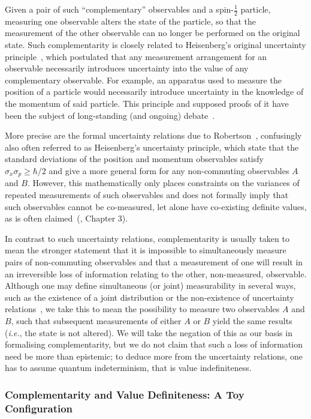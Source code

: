 \documentclass[information,article,accept,moreauthors,pdftex,12pt,a4paper]{mdpi}
\theoremstyle{mdpi}
\newcounter{ex}
\newcounter{re}
\theoremstyle{mdpidefinition}
\begin{document}
Given a pair of such ``complementary'' observables and a spin-$\frac{1}{2}$ particle, measuring one observable alters the state of the particle, so that the measurement of the other observable can no longer be performed on the original state.
Such complementarity is closely related to Heisenberg's original uncertainty principle~\cite{Heisenberg-27}, which postulated that any measurement arrangement for an observable necessarily introduces uncertainty into the value of any complementary observable.
For example, an apparatus used to measure the position of a particle would necessarily introduce uncertainty in the knowledge of the momentum of said particle.
This principle and supposed proofs of it have been the subject of long-standing (and ongoing) debate~\cite{Busch:2014lr,Cowen:2013fe,Rozema:2012hb}.

More precise are the formal uncertainty relations due to Robertson~\cite{Robertson:1929ee}, confusingly also often referred to as Heisenberg's uncertainty principle, which state that the standard deviations of the position and momentum observables satisfy $\sigma_x\sigma_p \ge \hbar/2$ and give a more general form for any non-commuting observables $A$ and $B$.
However, this mathematically only places constraints on the variances of repeated measurements of such observables and does not formally imply that such observables cannot be co-measured, let alone have co-existing definite values, as is often claimed~(\cite{Popper:1992ty}, Chapter 3). %

In contrast to such uncertainty relations, complementarity is usually taken to mean the stronger statement that it is impossible to simultaneously measure pairs of non-commuting observables and that a measurement of one will result in an irreversible loss of information relating to the other, non-measured, observable.
Although one may define simultaneous (or joint) measurability in several ways, such as the existence of a joint distribution or the non-existence of uncertainty relations~\cite{Fritz:2012fj}, we take this to mean the possibility to measure two observables $A$ and $B$, such that subsequent measurements of either $A$ or $B$ yield the same results (\emph{i.e.}, the state is not altered).
We will take the negation of this as our basis in formalising complementarity, but we do not claim that such a loss of information need be more than epistemic;
to deduce more from the uncertainty relations, one has to assume quantum indeterminism, that is value indefiniteness.


\subsubsection{Complementarity and Value Definiteness: A Toy Configuration}
\label{sec:Mealy}
\end{document}
